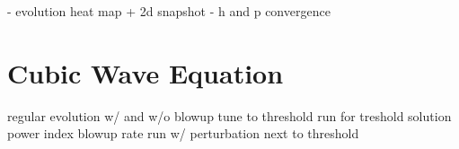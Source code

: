 - evolution heat map + 2d snapshot
- h and p convergence


\section{Cubic Wave Equation}
\label{section:hyp_cubic_wave}


regular evolution w/ and w/o blowup
tune to threshold
run for treshold solution
power index
blowup rate
run w/ perturbation next to threshold
